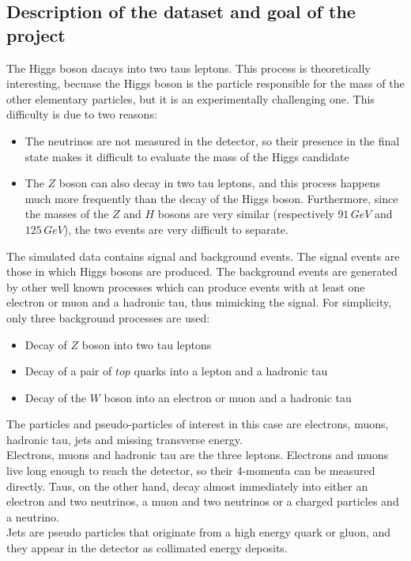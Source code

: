 \documentclass[12pt]{article}
\begin{document}
\subsection{Description of the dataset and goal of the project}
The Higgs boson dacays into two taus leptons. This process is theoretically interesting, becuase the Higgs 
boson is the particle responsible for the mass of the other elementary particles, but it is an experimentally 
challenging one. This difficulty is due to two reasons:
\begin{itemize}
  \item The neutrinos are not measured in the detector, so their presence in the final state makes it 
	difficult to evaluate the mass of the Higgs candidate
  \item The $Z$ boson can also decay in two tau leptons, and this process happens much more frequently than 
	the decay of the Higgs boson. Furthermore, since the masses of the $Z$ and $H$ bosons are very similar 
	(respectively $91\,GeV$ and $125\,GeV$), the two events are very difficult to separate.
\end{itemize}
The simulated data contains signal and background events. The signal events are those in which Higgs bosons
are produced. The background events are generated by other well known processes which can produce events with 
at least one electron or muon and a hadronic tau, thus mimicking the signal. For simplicity, only three
background processes are used:
\begin{itemize}
  \item Decay of $Z$ boson into two tau leptons
  \item Decay of a pair of $top$ quarks into a lepton and a hadronic tau
  \item Decay of the $W$ boson into an electron or muon and a hadronic tau
\end{itemize}
The particles and pseudo-particles of interest in this case are electrons, muons, hadronic tau, jets and 
missing transverse energy. \\
Electrons, muons and hadronic tau are the three leptons. Electrons and muons live long enough to reach the 
detector, so their 4-momenta can be measured directly. Taus, on the other hand, decay almost immediately 
into either an electron and two neutrinos, a muon and two neutrinos or a charged particles and a neutrino. \\
Jets are pseudo particles that originate from a high energy quark or gluon, and they appear in the detector 
as collimated energy deposits. \\ \\
\end{document}
